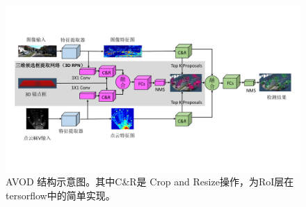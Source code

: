 \begin{figure}[!t]
	\centering
	\includegraphics[trim={1cm, 3.5cm, 1cm, 3.5cm}, clip,width=\textwidth]{./imgs/avod.pdf}
	\caption{AVOD 结构示意图\cite{ku2018joint}。其中C\&R是 Crop and Resize操作，为RoI层在tersorflow中的简单实现。}
	\label{fig:avod}
\end{figure}
